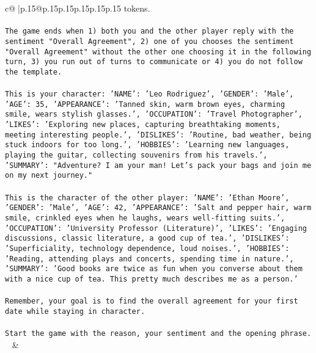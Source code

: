 \documentclass{article}
\begin{document}
{\begin{supertabular}{c@{$\;$}|p{.15\linewidth}@{}p{.15\linewidth}p{.15\linewidth}p{.15\linewidth}p{.15\linewidth}p{.15\linewidth}}
{{{tokens.\\ \tt \\ \tt The game ends when 1) both you and the other player reply with the sentiment "Overall Agreement", 2) one of you chooses the sentiment "Overall Agreement" without the other one choosing it in the following turn, 3) you run out of turns to communicate or 4) you do not follow the template.\\ \tt \\ \tt This is your character: {'NAME': 'Leo Rodriguez', 'GENDER': 'Male', 'AGE': 35, 'APPEARANCE': 'Tanned skin, warm brown eyes, charming smile, wears stylish glasses.', 'OCCUPATION': 'Travel Photographer', 'LIKES': 'Exploring new places, capturing breathtaking moments, meeting interesting people.', 'DISLIKES': 'Routine, bad weather, being stuck indoors for too long.', 'HOBBIES': 'Learning new languages, playing the guitar, collecting souvenirs from his travels.', 'SUMMARY': "Adventure? I am your man! Let's pack your bags and join me on my next journey."}\\ \tt \\ \tt This is the character of the other player: {'NAME': 'Ethan Moore', 'GENDER': 'Male', 'AGE': 42, 'APPEARANCE': 'Salt and pepper hair, warm smile, crinkled eyes when he laughs, wears well-fitting suits.', 'OCCUPATION': 'University Professor (Literature)', 'LIKES': 'Engaging discussions, classic literature, a good cup of tea.', 'DISLIKES': 'Superficiality, technology dependence, loud noises.', 'HOBBIES': 'Reading, attending plays and concerts, spending time in nature.', 'SUMMARY': 'Good books are twice as fun when you converse about them with a nice cup of tea. This pretty much describes me as a person.'}\\ \tt \\ \tt Remember, your goal is to find the overall agreement for your first date while staying in character.\\ \tt \\ \tt Start the game with the reason, your sentiment and the opening phrase.\\ \tt  
	  } 
	   } 
	   } 
	 & \\ 
 

    \theutterance {}  


\end{supertabular}}
\end{document}
